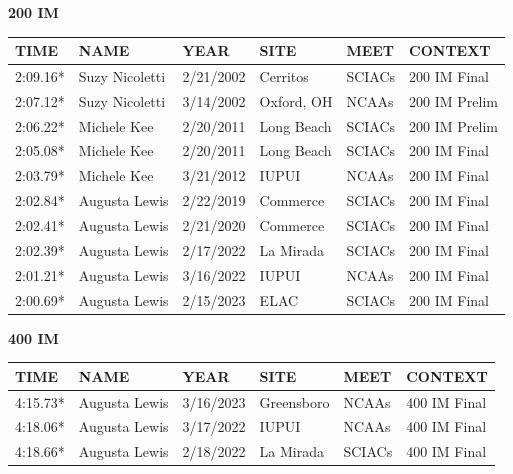 \begin{table}[H]
\centering
\begin{minipage}[t]{0.48\textwidth}
\centering
\textbf{200 IM}\\[0.1cm]
\begin{tabular}{@{}p{1.8cm}p{2.8cm}p{1.2cm}p{1.4cm}p{1.4cm}p{2.0cm}@{}}
\hline
    \textbf{TIME} & \textbf{NAME} & \textbf{YEAR} & \textbf{SITE} & \textbf{MEET} & \textbf{CONTEXT} \\
\hline
    2:09.16* & Suzy Nicoletti & 2/21/2002 & Cerritos & SCIACs & 200 IM Final \\
    2:07.12* & Suzy Nicoletti & 3/14/2002 & Oxford, OH & NCAAs & 200 IM Prelim \\
    2:06.22* & Michele Kee & 2/20/2011 & Long Beach & SCIACs & 200 IM Prelim \\
    2:05.08* & Michele Kee & 2/20/2011 & Long Beach & SCIACs & 200 IM Final \\
    2:03.79* & Michele Kee & 3/21/2012 & IUPUI & NCAAs & 200 IM Final \\
    2:02.84* & Augusta Lewis & 2/22/2019 & Commerce & SCIACs & 200 IM Final \\
    2:02.41* & Augusta Lewis & 2/21/2020 & Commerce & SCIACs & 200 IM Final \\
    2:02.39* & Augusta Lewis & 2/17/2022 & La Mirada & SCIACs & 200 IM Final \\
    2:01.21* & Augusta Lewis & 3/16/2022 & IUPUI & NCAAs & 200 IM Final \\
    2:00.69* & Augusta Lewis & 2/15/2023 & ELAC & SCIACs & 200 IM Final \\
\hline
\end{tabular}
\end{minipage}\hfill
\begin{minipage}[t]{0.48\textwidth}
\centering
\textbf{400 IM}\\[0.1cm]
\begin{tabular}{@{}p{1.8cm}p{2.8cm}p{1.2cm}p{1.4cm}p{1.4cm}p{2.0cm}@{}}
\hline
    \textbf{TIME} & \textbf{NAME} & \textbf{YEAR} & \textbf{SITE} & \textbf{MEET} & \textbf{CONTEXT} \\
\hline
    4:15.73* & Augusta Lewis & 3/16/2023 & Greensboro & NCAAs & 400 IM Final \\
    4:18.06* & Augusta Lewis & 3/17/2022 & IUPUI & NCAAs & 400 IM Final \\
    4:18.66* & Augusta Lewis & 2/18/2022 & La Mirada & SCIACs & 400 IM Final \\

\end{tabular}
\end{minipage}
\end{table}

